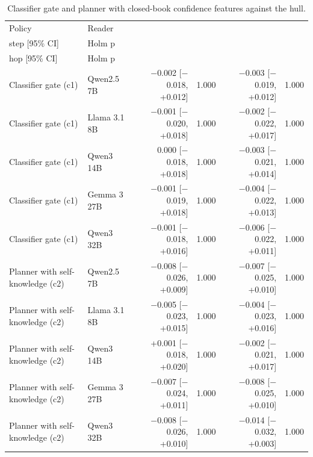 \begin{table}[t]
\centering\small
\setlength{\tabcolsep}{4pt}
\caption{Classifier gate and planner with closed-book confidence features against the hull.}
\label{tab:stronger}
\begin{tabular*}{\linewidth}{@{\extracolsep{\fill}}llrrrr}
\toprule
Policy & Reader & \begin{tabular}[b]{@{}r@{}}Gain, single \\ step [95\% CI]\end{tabular} & Holm p & \begin{tabular}[b]{@{}r@{}}Gain, with two \\ hop [95\% CI]\end{tabular} & Holm p  \\
\midrule
Classifier gate (c1) & Qwen2.5 7B & $-$0.002 [$-$0.018, +0.012] & 1.000 & $-$0.003 [$-$0.019, +0.012] & 1.000 \\
Classifier gate (c1) & Llama 3.1 8B & $-$0.001 [$-$0.020, +0.018] & 1.000 & $-$0.002 [$-$0.022, +0.017] & 1.000 \\
Classifier gate (c1) & Qwen3 14B & 0.000 [$-$0.018, +0.018] & 1.000 & $-$0.003 [$-$0.021, +0.014] & 1.000 \\
Classifier gate (c1) & Gemma 3 27B & $-$0.001 [$-$0.019, +0.018] & 1.000 & $-$0.004 [$-$0.022, +0.013] & 1.000 \\
Classifier gate (c1) & Qwen3 32B & $-$0.001 [$-$0.018, +0.016] & 1.000 & $-$0.006 [$-$0.022, +0.011] & 1.000 \\
Planner with self-knowledge (c2) & Qwen2.5 7B & $-$0.008 [$-$0.026, +0.009] & 1.000 & $-$0.007 [$-$0.025, +0.010] & 1.000 \\
Planner with self-knowledge (c2) & Llama 3.1 8B & $-$0.005 [$-$0.023, +0.015] & 1.000 & $-$0.004 [$-$0.023, +0.016] & 1.000 \\
Planner with self-knowledge (c2) & Qwen3 14B & +0.001 [$-$0.018, +0.020] & 1.000 & $-$0.002 [$-$0.021, +0.017] & 1.000 \\
Planner with self-knowledge (c2) & Gemma 3 27B & $-$0.007 [$-$0.024, +0.011] & 1.000 & $-$0.008 [$-$0.025, +0.010] & 1.000 \\
Planner with self-knowledge (c2) & Qwen3 32B & $-$0.008 [$-$0.026, +0.010] & 1.000 & $-$0.014 [$-$0.032, +0.003] & 1.000 \\
\bottomrule
\end{tabular*}
\end{table}
